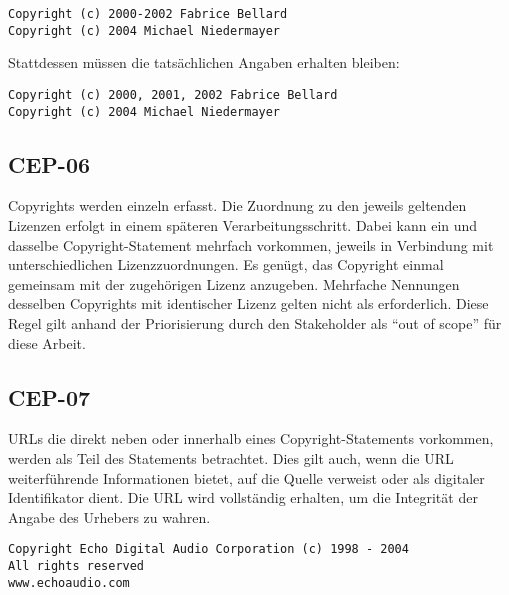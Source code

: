 \begin{lstlisting}[numbers=none, keepspaces=true]
Copyright (c) 2000-2002 Fabrice Bellard
Copyright (c) 2004 Michael Niedermayer
\end{lstlisting}

Stattdessen müssen die tatsächlichen Angaben erhalten bleiben:

\begin{lstlisting}[numbers=none, keepspaces=true]
Copyright (c) 2000, 2001, 2002 Fabrice Bellard
Copyright (c) 2004 Michael Niedermayer
\end{lstlisting}


\subsection{CEP-06}\label{subsec:cep-06}

Copyrights werden einzeln erfasst.
Die Zuordnung zu den jeweils geltenden Lizenzen erfolgt in einem späteren Verarbeitungsschritt.
Dabei kann ein und dasselbe Copyright-Statement mehrfach vorkommen, jeweils in Verbindung mit unterschiedlichen Lizenzzuordnungen.
Es genügt, das Copyright einmal gemeinsam mit der zugehörigen Lizenz anzugeben.
Mehrfache Nennungen desselben Copyrights mit identischer Lizenz gelten nicht als erforderlich.
Diese Regel gilt anhand der Priorisierung durch den Stakeholder als \enquote{out of scope} für diese Arbeit.



\subsection{CEP-07}\label{subsec:cep-07}

URLs die direkt neben oder innerhalb eines Copyright-Statements vorkommen, werden als Teil des Statements betrachtet.
Dies gilt auch, wenn die URL weiterführende Informationen bietet, auf die Quelle verweist oder als digitaler Identifikator dient.
Die URL wird vollständig erhalten, um die Integrität der Angabe des Urhebers zu wahren.

\begin{lstlisting}[numbers=none, keepspaces=true]
Copyright Echo Digital Audio Corporation (c) 1998 - 2004
All rights reserved
www.echoaudio.com
\end{lstlisting}

